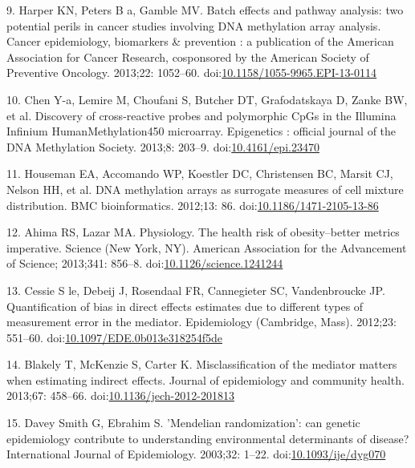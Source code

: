 \documentclass[]{article}
\begin{document}
\leavevmode\hypertarget{ref-Harper2013}{}%
9. Harper KN, Peters B a, Gamble MV. Batch effects and pathway analysis:
two potential perils in cancer studies involving DNA methylation array
analysis. Cancer epidemiology, biomarkers \& prevention : a publication
of the American Association for Cancer Research, cosponsored by the
American Society of Preventive Oncology. 2013;22: 1052--60.
doi:\href{https://doi.org/10.1158/1055-9965.EPI-13-0114}{10.1158/1055-9965.EPI-13-0114}

\leavevmode\hypertarget{ref-Chen2013a}{}%
10. Chen Y-a, Lemire M, Choufani S, Butcher DT, Grafodatskaya D, Zanke
BW, et al. Discovery of cross-reactive probes and polymorphic CpGs in
the Illumina Infinium HumanMethylation450 microarray. Epigenetics :
official journal of the DNA Methylation Society. 2013;8: 203--9.
doi:\href{https://doi.org/10.4161/epi.23470}{10.4161/epi.23470}

\leavevmode\hypertarget{ref-Houseman2012}{}%
11. Houseman EA, Accomando WP, Koestler DC, Christensen BC, Marsit CJ,
Nelson HH, et al. DNA methylation arrays as surrogate measures of cell
mixture distribution. BMC bioinformatics. 2012;13: 86.
doi:\href{https://doi.org/10.1186/1471-2105-13-86}{10.1186/1471-2105-13-86}

\leavevmode\hypertarget{ref-Ahima2013}{}%
12. Ahima RS, Lazar MA. Physiology. The health risk of obesity--better
metrics imperative. Science (New York, NY). American Association for the
Advancement of Science; 2013;341: 856--8.
doi:\href{https://doi.org/10.1126/science.1241244}{10.1126/science.1241244}

\leavevmode\hypertarget{ref-LeCessie2012}{}%
13. Cessie S le, Debeij J, Rosendaal FR, Cannegieter SC, Vandenbroucke
JP. Quantification of bias in direct effects estimates due to different
types of measurement error in the mediator. Epidemiology (Cambridge,
Mass). 2012;23: 551--60.
doi:\href{https://doi.org/10.1097/EDE.0b013e318254f5de}{10.1097/EDE.0b013e318254f5de}

\leavevmode\hypertarget{ref-Blakely2013}{}%
14. Blakely T, McKenzie S, Carter K. Misclassification of the mediator
matters when estimating indirect effects. Journal of epidemiology and
community health. 2013;67: 458--66.
doi:\href{https://doi.org/10.1136/jech-2012-201813}{10.1136/jech-2012-201813}

\leavevmode\hypertarget{ref-DaveySmith2003}{}%
15. Davey Smith G, Ebrahim S. 'Mendelian randomization': can genetic
epidemiology contribute to understanding environmental determinants of
disease? International Journal of Epidemiology. 2003;32: 1--22.
doi:\href{https://doi.org/10.1093/ije/dyg070}{10.1093/ije/dyg070}
\end{document}
